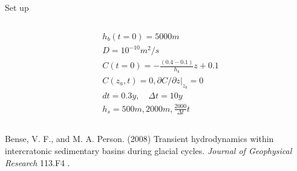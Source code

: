 \documentclass{beamer}
\begin{document}
\begin{frame}{Set up}
\begin{columns}
{\begin{column}{0.7\textwidth}
\begin{align*}
& h_b(t=0)=5000m\\
& D  =10^{-10} m^2/s \\
& C (t=0) = -\frac{(0.4-0.1)}{h_b}z + 0.1\\ 
& C (z_a, t) =0, \partial C / \partial z | _{z_b} =0\\
& dt = 0.3 y , \quad \Delta t =10 y\\
& h_s=500 m , 2000 m , \frac{2000}{\Delta t}t 
\end{align*}
\end{column}
}
\end{columns}
\tiny{
\begin{thebibliography}{99} %
 Bense, V. F., and M. A. Person. (2008)
\newblock Transient hydrodynamics within intercratonic sedimentary basins during glacial cycles.
\newblock \emph{Journal of Geophysical Research} 113.F4 .
\end{thebibliography}
}
\end{frame}
\end{document}
